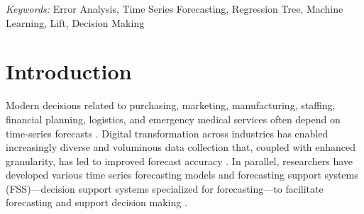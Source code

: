 \documentclass[12pt]{article}
\begin{document}
\begin{abstract}
\end{abstract}

\noindent%
{\it Keywords:} Error Analysis, Time Series Forecasting, Regression Tree, Machine Learning, Lift, Decision Making
\vfill

\newpage
{} %

\section{Introduction}
\label{sec:Intro}
Modern decisions related to purchasing, marketing, manufacturing, staffing, financial planning, logistics, and emergency medical services often depend on time-series forecasts \citep{abreu2023}. Digital transformation across industries has enabled increasingly diverse and voluminous data collection that, coupled with enhanced granularity, has led to improved forecast accuracy \citep{chae2024}. In parallel, researchers have developed various time series forecasting models and forecasting support systems (FSS)---decision support systems specialized for forecasting---to facilitate forecasting and support decision making \citep{asimakopoulos2013, petropoulos2022}. %
\end{document}
